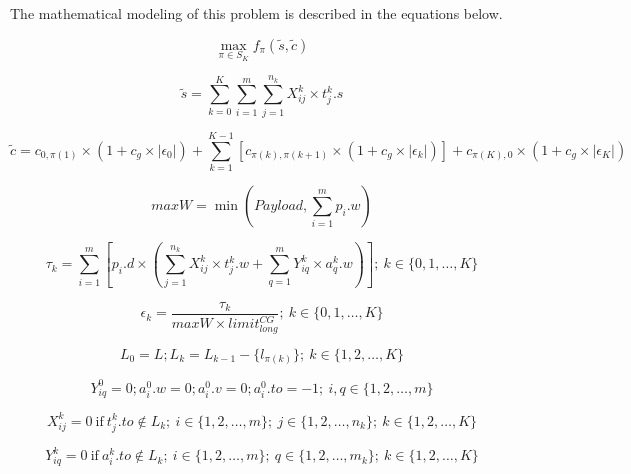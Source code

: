 \documentclass[preprint,authoryear]{elsarticle}
\begin{document}
The mathematical modeling of this problem is described in the equations below.


\begin{equation} \label{eq:maxf}
	\max_{\pi \in S_K} f_\pi(\tilde{s},\tilde{c})
\end{equation}

\begin{equation} \label{eq:scores}
	\tilde{s} = \sum_{k=0}^{K} \sum_{i=1}^{m} \sum_{j=1}^{n_k} X_{ij}^k \times t_j^k.s
\end{equation}

\begin{equation} \label{eq:costs}
	\tilde{c} = c_{0,\pi(1)}\times(1+c_g\times|\epsilon_0|) + \sum_{k=1}^{K-1} [ c_{\pi(k), \pi(k+1)}\times(1+c_g\times|\epsilon_k|) ] + c_{\pi(K),0}\times(1+c_g\times|\epsilon_K|)
\end{equation}

\begin{equation} \label{eq:maxW}
	maxW = \min(Payload, \sum_{i=1}^{m}p_i.w)
\end{equation}

\begin{equation} \label{eq:tau}
\tau_k = \sum_{i=1}^{m}[ p_i.d \times (\sum_{j=1}^{n_k} X_{ij}^k \times t_j^k.w +  \sum_{q=1}^{m} Y_{iq}^k \times a_q^k.w)];\ k \in \{0, 1, \ldots, K\}
\end{equation}

\begin{equation} \label{eq:eps}
\epsilon_k = \frac{\tau_k}{maxW \times limit^{CG}_{long}};\ k \in \{0, 1, \ldots, K\}
\end{equation}

\begin{equation} \label{eq:pdp11}
	L_0 = L; L_{k} = L_{k-1} - \{l_{\pi(k)}\}; \ k \in \{1, 2, \ldots, K\}
\end{equation}

\begin{equation} \label{eq:pdp13}
	Y^0_{iq} = 0; a^0_i.w = 0; a^0_i.v = 0; a^0_i.to = -1;\ i,q \in \{1, 2, \ldots, m\}
\end{equation}

\begin{equation} \label{eq:pdp12}
	X_{ij}^k = 0 \ \mbox{if} \ t_j^k.to \notin L_k; \ i \in \{1, 2, \ldots, m\}; \ j \in \{1, 2, \ldots, n_k\}; \ k \in \{1,2, \ldots, K\}
\end{equation}

\begin{equation} \label{eq:pdp9}
	Y_{iq}^k = 0 \ \mbox{if} \ a_i^k.to \notin L_k; \ i \in \{1, 2, \ldots, m\}; \ q \in \{1, 2, \ldots, m_k\}; \ k \in \{ 1, 2, \ldots, K\}
\end{equation}
\end{document}
